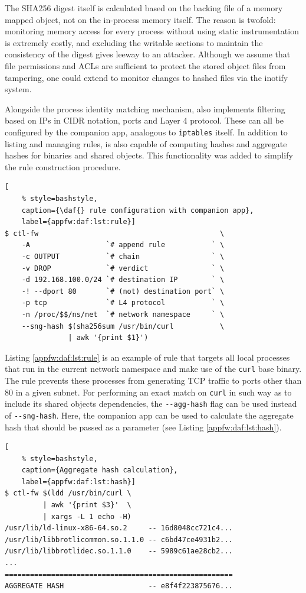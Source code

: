 The SHA256 digest itself is calculated based on the backing file of a memory mapped object, not on the in-process memory itself. The reason is twofold: monitoring memory access for every process without using static instrumentation is extremely costly, and excluding the writable sections to maintain the consistency of the digest gives leeway to an attacker. Although we assume that file permissions and ACLs are sufficient to protect the stored object files from tampering, one could extend \daf{} to monitor changes to hashed files via the inotify system.

Alongside the process identity matching mechanism, \daf{} also implements filtering based on IPs in CIDR notation, ports and Layer 4 protocol. These can all be configured by the \daf{} companion app, analogous to \texttt{iptables} itself. In addition to listing and managing rules, \daf{} is also capable of computing hashes and aggregate hashes for binaries and shared objects. This functionality was added to simplify the rule construction procedure.

\begin{lstlisting}[
    % style=bashstyle,
    caption={\daf{} rule configuration with companion app},
    label={appfw:daf:lst:rule}]
$ ctl-fw                                           \
    -A                  `# append rule           ` \
    -c OUTPUT           `# chain                 ` \
    -v DROP             `# verdict               ` \
    -d 192.168.100.0/24 `# destination IP        ` \
    -! --dport 80       `# (not) destination port` \
    -p tcp              `# L4 protocol           ` \
    -n /proc/$$/ns/net  `# network namespace     ` \
    --sng-hash $(sha256sum /usr/bin/curl           \
               | awk '{print $1}')
\end{lstlisting}

Listing \ref{appfw:daf:lst:rule} is an example of \daf{} rule that targets all local processes that run in the current network namespace and make use of the \texttt{curl} base binary. The rule prevents these processes from generating TCP traffic to ports other than 80 in a given subnet. For performing an exact match on \texttt{curl} in such way as to include its shared objects dependencies, the \texttt{-{}-agg-hash} flag can be used instead of \texttt{-{}-sng-hash}. Here, the companion app can be used to calculate the aggregate hash that should be passed as a parameter (see Listing \ref{appfw:daf:lst:hash}).

\begin{lstlisting}[
    % style=bashstyle,
    caption={Aggregate hash calculation},
    label={appfw:daf:lst:hash}]
$ ctl-fw $(ldd /usr/bin/curl \
         | awk '{print $3}'  \
         | xargs -L 1 echo -H)
/usr/lib/ld-linux-x86-64.so.2     -- 16d8048cc721c4...
/usr/lib/libbrotlicommon.so.1.1.0 -- c6bd47ce4931b2...
/usr/lib/libbrotlidec.so.1.1.0    -- 5989c61ae28cb2...
...
======================================================
AGGREGATE HASH                    -- e8f4f223875676...
\end{lstlisting}


